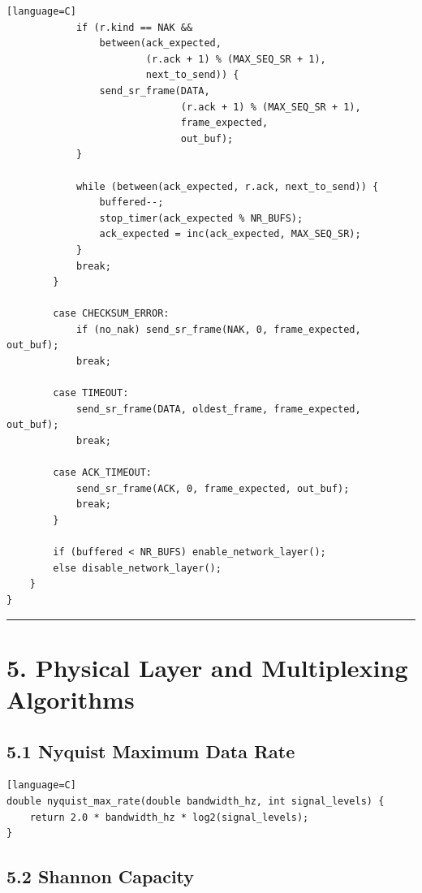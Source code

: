 \documentclass[11pt]{article}
\begin{document}
\begin{verbatim}[language=C]
            if (r.kind == NAK &&
                between(ack_expected,
                        (r.ack + 1) % (MAX_SEQ_SR + 1),
                        next_to_send)) {
                send_sr_frame(DATA,
                              (r.ack + 1) % (MAX_SEQ_SR + 1),
                              frame_expected,
                              out_buf);
            }

            while (between(ack_expected, r.ack, next_to_send)) {
                buffered--;
                stop_timer(ack_expected % NR_BUFS);
                ack_expected = inc(ack_expected, MAX_SEQ_SR);
            }
            break;
        }

        case CHECKSUM_ERROR:
            if (no_nak) send_sr_frame(NAK, 0, frame_expected, out_buf);
            break;

        case TIMEOUT:
            send_sr_frame(DATA, oldest_frame, frame_expected, out_buf);
            break;

        case ACK_TIMEOUT:
            send_sr_frame(ACK, 0, frame_expected, out_buf);
            break;
        }

        if (buffered < NR_BUFS) enable_network_layer();
        else disable_network_layer();
    }
}
\end{verbatim}

\begin{center}\rule{0.5\linewidth}{0.5pt}\end{center}

\section{5. Physical Layer and Multiplexing
Algorithms}\label{physical-layer-and-multiplexing-algorithms}

\subsection{5.1 Nyquist Maximum Data
Rate}\label{nyquist-maximum-data-rate}

\begin{verbatim}[language=C]
double nyquist_max_rate(double bandwidth_hz, int signal_levels) {
    return 2.0 * bandwidth_hz * log2(signal_levels);
}
\end{verbatim}

\subsection{5.2 Shannon Capacity}\label{shannon-capacity}
\end{document}
